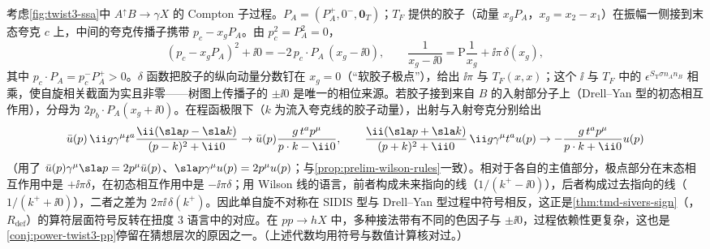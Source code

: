 \begin{example}[最低阶的软胶子极点机制]\label{ex:power-sgp}
考虑\cref{fig:twist3-ssa}中 $A^\uparrow B\to\gamma X$ 的 Compton 子过程。$P_A=(P_A^+,0^-,\mathbf0_T)$；$T_F$ 提供的胶子（动量 $x_gP_A$，$x_g=x_2-x_1$）在振幅一侧接到末态夸克 $c$ 上，中间的夸克传播子携带 $p_c-x_gP_A$。由 $p_c^2=P_A^2=0$，
\begin{equation}\label{eq:power-sgp-den}
(p_c-x_gP_A)^2+\ii0=-2\,p_c\cdot P_A\,(x_g-\ii0),\qquad \frac{1}{x_g-\ii0}=\mathrm P\frac{1}{x_g}+\ii\pi\,\delta(x_g),
\end{equation}
其中 $p_c\cdot P_A=p_c^-P_A^+>0$。$\delta$ 函数把胶子的纵向动量分数钉在 $x_g=0$（“软胶子极点”），给出 $\ii\pi$ 与 $T_F(x,x)$；这个 $\ii$ 与 $T_F$ 中的 $\epsilon^{S_{\mathrm T}\sigma n_An_B}$ 相乘，使自旋相关截面为实且非零——树图上传播子的 $\pm\ii0$ 是唯一的相位来源。若胶子接到来自 $B$ 的入射部分子上（Drell--Yan 型的初态相互作用），分母为 $2p_b\cdot P_A(x_g+\ii0)$。在程函极限下（$k$ 为流入夸克线的胶子动量），出射与入射夸克分别给出
\begin{equation}\label{eq:power-sgp-eik}
\bar u(p)\,\ii g\gamma^\mu t^a\frac{\ii(\sla p-\sla k)}{(p-k)^2+\ii0}\to\bar u(p)\frac{g\,t^ap^\mu}{p\cdot k-\ii0},\qquad
\frac{\ii(\sla p+\sla k)}{(p+k)^2+\ii0}\,\ii g\gamma^\mu t^au(p)\to-\frac{g\,t^ap^\mu}{p\cdot k+\ii0}u(p)
\end{equation}
（用了 $\bar u(p)\gamma^\mu\sla p=2p^\mu\bar u(p)$、$\sla p\gamma^\mu u(p)=2p^\mu u(p)$；与\cref{prop:prelim-wilson-rules}一致）。相对于各自的主值部分，极点部分在末态相互作用中是 $+\ii\pi\delta$，在初态相互作用中是 $-\ii\pi\delta$；用 Wilson 线的语言，前者构成未来指向的线（$1/(k^+-\ii0)$），后者构成过去指向的线（$1/(k^++\ii0)$），二者之差为 $2\pi\ii\,\delta(k^+)$。因此单自旋不对称在 SIDIS 型与 Drell--Yan 型过程中符号相反，这正是\cref{thm:tmd-sivers-sign}（\tagR，$R_{\mathrm{def}}$）的算符层面符号反转在扭度 3 语言中的对应。在 $pp\to hX$ 中，多种接法带有不同的色因子与 $\pm\ii0$，过程依赖性更复杂，这也是\cref{conj:power-twist3-pp}停留在猜想层次的原因之一。（上述代数均用符号与数值计算核对过。）
\end{example}

